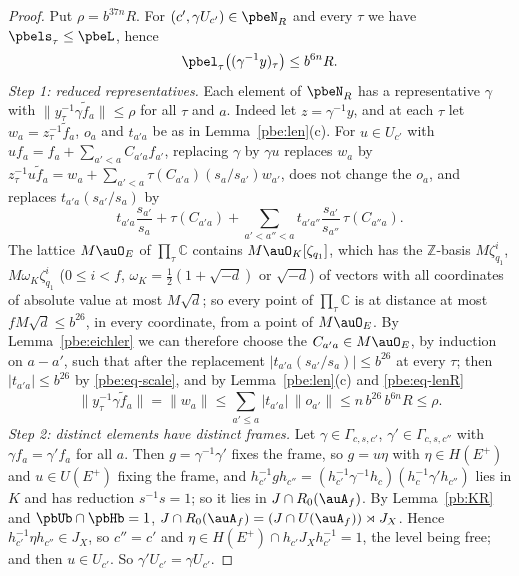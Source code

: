 \documentclass[10pt]{amsart}
\theoremstyle{definition}
\theoremstyle{remark}
\newcommand{\C}{\mathbb C}
\newcommand{\Z}{\mathbb Z}
\begin{document}
\begin{proof}
Put $\rho=b^{37n}R$. For $(c',\gamma U_{c'})\in\pbeN_R$ and every $\tau$ we have $\pbels_\tau\le\pbeL$,
hence
\begin{equation}\label{pbe:eq-lenR}
\pbel_\tau\bigl((\gamma^{-1}y)_\tau\bigr)\le b^{6n}R .
\end{equation}
\emph{Step 1: reduced representatives.} Each element of $\pbeN_R$ has a representative $\gamma$ with
$\|y_\tau^{-1}\gamma\tilde f_a\|\le\rho$ for all $\tau$ and $a$. Indeed let $z=\gamma^{-1}y$, and at
each $\tau$ let $w_a=z_\tau^{-1}\tilde f_a$, $o_a$ and $t_{a'a}$ be as in Lemma~\ref{pbe:len}(c). For
$u\in U_{c'}$ with $uf_a=f_a+\sum_{a'<a}C_{a'a}f_{a'}$, replacing $\gamma$ by $\gamma u$ replaces
$w_a$ by $z_\tau^{-1}u\tilde f_a=w_a+\sum_{a'<a}\tau(C_{a'a})(s_a/s_{a'})w_{a'}$, does not change the
$o_a$, and replaces $t_{a'a}(s_{a'}/s_a)$ by
\[
t_{a'a}\frac{s_{a'}}{s_a}+\tau(C_{a'a})+\sum_{a'<a''<a}t_{a'a''}\frac{s_{a'}}{s_{a''}}\,\tau(C_{a''a}).
\]
The lattice $M\auO_E$ of $\prod_\tau\C$ contains $M\auO_K[\zeta_{q_1}]$, which has the $\Z$-basis
$M\zeta_{q_1}^i$, $M\omega_K\zeta_{q_1}^i$ ($0\le i<f$, $\omega_K=\frac12(1+\sqrt{-d})$ or $\sqrt{-d}$)
of vectors with all coordinates of absolute value at most $M\sqrt d$; so every point of
$\prod_\tau\C$ is at distance at most $fM\sqrt d\le b^{26}$, in every coordinate, from a point of $M
\auO_E$. By Lemma~\ref{pbe:eichler} we can therefore choose the $C_{a'a}\in M\auO_E$, by induction
on $a-a'$, such that after the replacement $|t_{a'a}(s_{a'}/s_a)|\le b^{26}$ at every $\tau$; then
$|t_{a'a}|\le b^{26}$ by \eqref{pbe:eq-scale}, and by Lemma~\ref{pbe:len}(c) and \eqref{pbe:eq-lenR}
\[
\|y_\tau^{-1}\gamma\tilde f_a\|=\|w_a\|\le\sum_{a'\le a}|t_{a'a}|\,\|o_{a'}\|\le n\,b^{26}\,b^{6n}R\le\rho .
\]
\emph{Step 2: distinct elements have distinct frames.} Let $\gamma\in\Gamma_{c,s,c'}$, $\gamma'\in
\Gamma_{c,s,c''}$ with $\gamma f_a=\gamma'f_a$ for all $a$. Then $g=\gamma^{-1}\gamma'$ fixes the
frame, so $g=u\eta$ with $\eta\in H(E^+)$ and $u\in U(E^+)$ fixing the frame, and
$h_{c'}^{-1}gh_{c''}=(h_{c'}^{-1}\gamma^{-1}h_c)(h_c^{-1}\gamma'h_{c''})$ lies in $K$ and has reduction
$s^{-1}s=1$; so it lies in $J\cap R_0(\auA_f)$. By Lemma~\ref{pb:KR} and $\pbUb\cap\pbHb=1$,
$J\cap R_0(\auA_f)=(J\cap U(\auA_f))\rtimes J_X$. Hence $h_{c'}^{-1}\eta h_{c''}\in J_X$, so $c''=c'$
and $\eta\in H(E^+)\cap h_{c'}J_Xh_{c'}^{-1}=1$, the level being free; and then $u\in U_{c'}$. So
$\gamma'U_{c'}=\gamma U_{c'}$.


\end{proof}
\end{document}
